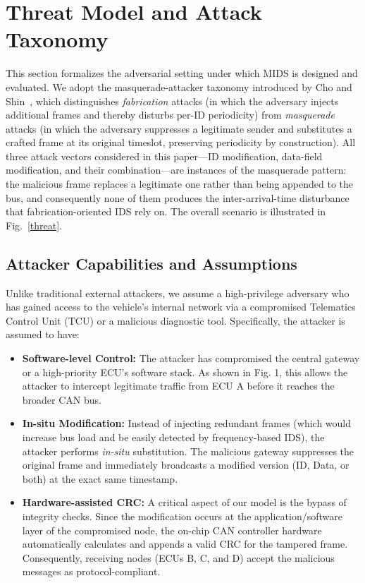 \documentclass[lettersize,journal]{IEEEtran}
\begin{document}
\section{Threat Model and Attack Taxonomy}
\label{sec:threat}

This section formalizes the adversarial setting under which 
MIDS is designed and evaluated. We adopt the masquerade-attacker 
taxonomy introduced by Cho and Shin~\cite{b37}, 
which distinguishes \emph{fabrication} attacks (in which the 
adversary injects additional frames and thereby disturbs 
per-ID periodicity) from \emph{masquerade} attacks (in which 
the adversary suppresses a legitimate sender and substitutes 
a crafted frame at its original timeslot, preserving 
periodicity by construction). All three attack vectors 
considered in this paper---ID modification, data-field 
modification, and their combination---are instances of the 
masquerade pattern: the malicious frame replaces a legitimate 
one rather than being appended to the bus, and consequently 
none of them produces the inter-arrival-time disturbance that 
fabrication-oriented IDS rely on. The overall scenario is 
illustrated in Fig.~\ref{threat}.

\subsection{Attacker Capabilities and Assumptions}
Unlike traditional external attackers, we assume a high-privilege adversary who has gained access to the vehicle's internal network via a compromised Telematics Control Unit (TCU) or a malicious diagnostic tool. Specifically, the attacker is assumed to have:
\begin{itemize}[leftmargin=*, nosep]
\item \textbf{Software-level Control:} The attacker has compromised the central gateway or a high-priority ECU's software stack. As shown in Fig. 1, this allows the attacker to intercept legitimate traffic from ECU A before it reaches the broader CAN bus.
\item \textbf{In-situ Modification:} Instead of injecting redundant frames (which would increase bus load and be easily detected by frequency-based IDS), the attacker performs \textit{in-situ} substitution. The malicious gateway suppresses the original frame and immediately broadcasts a modified version (ID, Data, or both) at the exact same timestamp.
\item \textbf{Hardware-assisted CRC:} A critical aspect of our model is the bypass of integrity checks. Since the modification occurs at the application/software layer of the compromised node, the on-chip CAN controller hardware automatically calculates and appends a valid CRC for the tampered frame. Consequently, receiving nodes (ECUs B, C, and D) accept the malicious messages as protocol-compliant.
\end{itemize}
\end{document}
